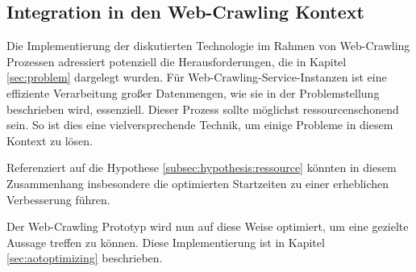 \subsection{Integration in den Web-Crawling Kontext}

Die Implementierung der diskutierten Technologie im Rahmen von Web-Crawling Prozessen adressiert potenziell die Herausforderungen, die in Kapitel \ref{sec:problem} dargelegt wurden. Für Web-Crawling-Service-Instanzen ist eine effiziente Verarbeitung großer Datenmengen, wie sie in der Problemstellung beschrieben wird, essenziell. Dieser Prozess sollte möglichst ressourcenschonend sein. So ist dies eine vielversprechende Technik, um einige Probleme in diesem Kontext zu lösen.

Referenziert auf die Hypothese \ref{subsec:hypothesis:ressource} könnten in diesem Zusammenhang insbesondere die optimierten Startzeiten zu einer erheblichen Verbesserung führen.

Der Web-Crawling Prototyp wird nun auf diese Weise optimiert, um eine gezielte Aussage treffen zu können. Diese Implementierung ist in Kapitel \ref{sec:aotoptimizing} beschrieben.
\chapterend
